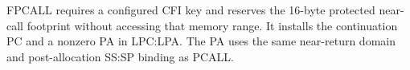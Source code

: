 FPCALL requires a configured CFI key and reserves the 16-byte protected near-call footprint without accessing that memory range. It installs the continuation PC and a nonzero PA in LPC:LPA. The PA uses the same near-return domain and post-allocation SS:SP binding as PCALL.
